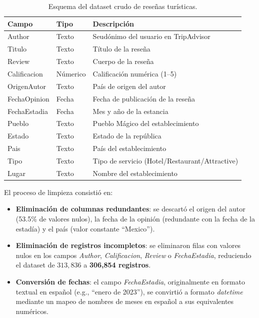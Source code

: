 \begin{table}[ht]
	\centering
	\caption{Esquema del dataset crudo de reseñas turísticas.}
	\label{tab:schema}
	\begin{tabular}{lll}
		\toprule
		\textbf{Campo} & \textbf{Tipo} & \textbf{Descripción}                           \\
		\midrule
		Author         & Texto         & Seudónimo del usuario en TripAdvisor           \\
		Titulo         & Texto         & Título de la reseña                            \\
		Review         & Texto         & Cuerpo de la reseña                            \\
		Calificacion   & Númerico      & Calificación numérica (1--5)                   \\
		OrigenAutor    & Texto         & País de origen del autor                       \\
		FechaOpinion   & Fecha         & Fecha de publicación de la reseña              \\
		FechaEstadia   & Fecha         & Mes y año de la estancia                       \\
		Pueblo         & Texto         & Pueblo Mágico del establecimiento              \\
		Estado         & Texto         & Estado de la república                         \\
		Pais           & Texto         & País del establecimiento                       \\
		Tipo           & Texto         & Tipo de servicio (Hotel/Restaurant/Attractive) \\
		Lugar          & Texto         & Nombre del establecimiento                     \\
		\bottomrule
	\end{tabular}
\end{table}

El proceso de limpieza consistió en:

\begin{itemize}
	\item \textbf{Eliminación de columnas redundantes}: se descartó el origen del autor (53.5\% de valores nulos), la fecha de la opinión (redundante con la fecha de la estadía) y el país (valor constante ``Mexico'').
	\item \textbf{Eliminación de registros incompletos}: se eliminaron filas con valores nulos en los campos \textit{Author}, \textit{Calificacion}, \textit{Review} o \textit{FechaEstadia}, reduciendo el dataset de $313{,}836$ a \textbf{306,854 registros}.
	\item \textbf{Conversión de fechas}: el campo \textit{FechaEstadia}, originalmente en formato textual en español (e.g., ``enero de 2023''), se convirtió a formato \textit{datetime} mediante un mapeo de nombres de meses en español a sus equivalentes numéricos.
\end{itemize}

